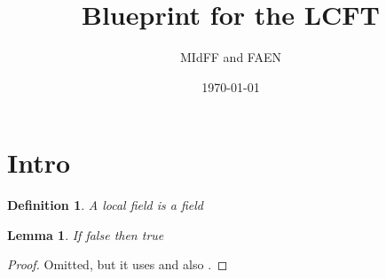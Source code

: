 \documentclass[11pt]{amsart}
\date{\today}
\title{Blueprint for the LCFT}
\author{MIdFF and FAEN}
\newtheorem{lemma}[theorem]{Lemma}
\newtheorem{definition}{Definition}
\begin{document}
\section{Intro}
\begin{definition}
\label{def_local_field}
A local field is a field
\end{definition}

\begin{lemma}
\label{A_cool_one}
\leanok
If false then true
\end{lemma}

\begin{proof}
\leanok
Omitted, but it uses \cite{SerCF} and also \cite{Se2}.
\end{proof}




\end{document}
